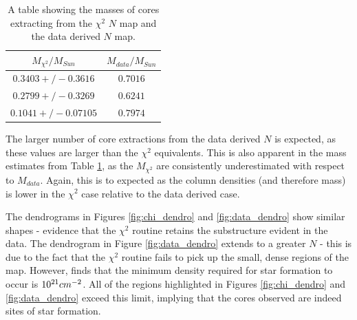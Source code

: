 \documentclass{report}
\begin{document}
\begin{table}[h]
  \centering
   \begin{tabular}{||c c||}
   \hline
   $M_{\chi^{2}}/M_{Sun}$ & $M_{data}/M_{Sun}$ \\ [0.5ex]
   \hline\hline
   $0.3403+/-0.3616$    & $0.7016$     \\
   \hline
   $0.2799+/-0.3269$  & $0.6241$ \\
   \hline
   $0.1041+/-0.07105$  & $0.7974$ \\
   \end{tabular}
   \caption{A table showing the masses of cores extracting from the $\chi^{2}$ $N$ map and the data derived $N$ map.}
   \label{table:mass}
\end{table}

The larger number of core extractions from the data derived $N$ is expected, as these values are larger than the $\chi^{2}$ equivalents. This is also apparent in the mass estimates from Table \ref{table:mass}, as the $M_{\chi^{2}}$ are consistently underestimated with respect to $M_{data}$. Again, this is to expected as the column densities (and therefore mass) is lower in the $\chi^{2}$ case relative to the data derived case.

The dendrograms in Figures \ref{fig:chi_dendro} and \ref{fig:data_dendro} show similar shapes - evidence that the $\chi^{2}$ routine retains the substructure evident in the data. The dendrogram in Figure
\ref{fig:data_dendro} extends to a greater $N$ - this is due to the fact that the $\chi^{2}$ routine fails to pick up the small, dense regions of the map. However, \textcite{coldensity} finds that the minimum density required for star formation to occur is $10^{21}\/cm^{-2}$. All of the regions highlighted in Figures \ref{fig:chi_dendro} and \ref{fig:data_dendro} exceed this limit, implying that the cores observed are indeed sites of star formation.

\end{document}
